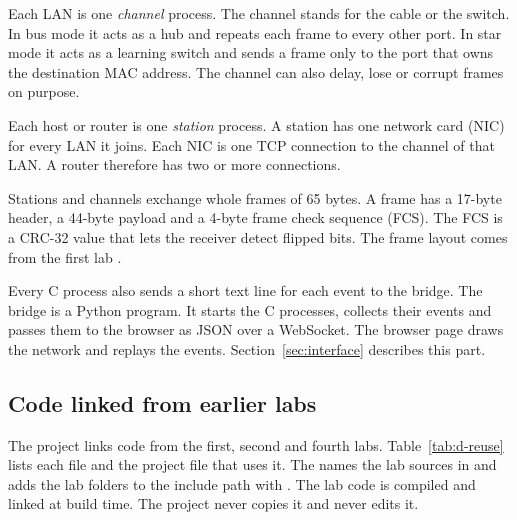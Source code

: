 Each LAN is one \emph{channel} process. The channel stands for the cable or the switch. In bus mode it acts as a hub and repeats each frame to every other port. In star mode it acts as a learning switch and sends a frame only to the port that owns the destination MAC address. The channel can also delay, lose or corrupt frames on purpose.

Each host or router is one \emph{station} process. A station has one network card (NIC) for every LAN it joins. Each NIC is one TCP connection to the channel of that LAN. A router therefore has two or more connections.

Stations and channels exchange whole frames of 65 bytes. A frame has a 17-byte header, a 44-byte payload and a 4-byte frame check sequence (FCS). The FCS is a CRC-32 value that lets the receiver detect flipped bits. The frame layout comes from the first lab \cite{lab1}.

Every C process also sends a short text line for each event to the bridge. The bridge is a Python program. It starts the C processes, collects their events and passes them to the browser as JSON over a WebSocket. The browser page draws the network and replays the events. Section~\ref{sec:interface} describes this part.

\subsection{Code linked from earlier labs}
The project links code from the first, second and fourth labs. Table~\ref{tab:d-reuse} lists each file and the project file that uses it. The  names the lab sources in  and adds the lab folders to the include path with . The lab code is compiled and linked at build time. The project never copies it and never edits it.

